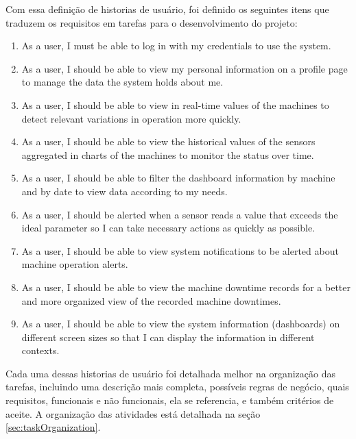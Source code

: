 Com essa definição de historias de usuário, foi definido os seguintes itens que traduzem os requisitos em tarefas para o desenvolvimento do projeto:


\begin{enumerate}
    \item As a user, I must be able to log in with my credentials to use the system.
    \item As a user, I should be able to view my personal information on a profile page to manage the data the system holds about me.
    \item As a user, I should be able to view in real-time values of the machines to detect relevant variations in operation more quickly.
    \item As a user, I should be able to view the historical values of the sensors aggregated in charts of the machines to monitor the status over time.
    \item As a user, I should be able to filter the dashboard information by machine and by date to view data according to my needs.
    \item As a user, I should be alerted when a sensor reads a value that exceeds the ideal parameter so I can take necessary actions as quickly as possible.
    \item As a user, I should be able to view system notifications to be alerted about machine operation alerts.
    \item As a user, I should be able to view the machine downtime records for a better and more organized view of the recorded machine downtimes.
    \item As a user, I should be able to view the system information (dashboards) on different screen sizes so that I can display the information in different contexts.
\end{enumerate}

Cada uma dessas historias de usuário foi detalhada melhor na organização das tarefas, incluindo uma descrição mais completa, possíveis regras de negócio, quais requisitos, funcionais e não funcionais, ela se referencia, e também critérios de aceite. A organização das atividades está detalhada na seção \ref{sec:taskOrganization}.


